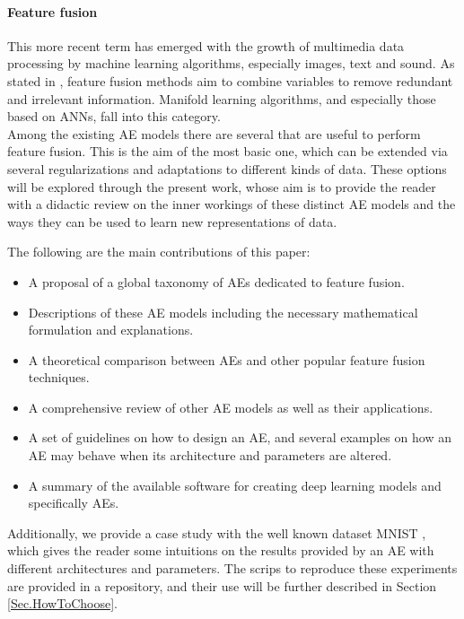 \documentclass[preprint,5p,compress]{elsarticle}
\begin{document}
    \paragraph{Feature fusion \cite{FeatureFusion}}
    This more recent term has emerged with the growth of multimedia data processing by machine learning algorithms, especially images, text and sound. As stated in \cite{FeatureFusion}, feature fusion methods aim to combine variables to remove redundant and irrelevant information. Manifold learning algorithms, and especially those based on ANNs, fall into this category. \\

    Among the existing AE models there are several that are useful to perform feature fusion. This is the aim of the most basic one, which can be extended via several regularizations and adaptations to different kinds of data. These options will be explored through the present work, whose aim is to provide the reader with a didactic review on the inner workings of these distinct AE models and the ways they can be used to learn new representations of data.

    The following are the main contributions of this paper:
    \begin{itemize}
	    \item A proposal of a global taxonomy of AEs dedicated to feature fusion.
	
	    \item Descriptions of these AE models including the necessary mathematical formulation and explanations.
	
	    \item A theoretical comparison between AEs and other popular feature fusion techniques.
	    
	    \item A comprehensive review of other AE models as well as their applications.
	      
	    \item A set of guidelines on how to design an AE, and several examples on how an AE may behave when its architecture and parameters are altered.

            \item A summary of the available software for creating deep learning models and specifically AEs.
    \end{itemize}

    Additionally, we provide a case study with the well known dataset MNIST \cite{MNIST}, which gives the reader some intuitions on the results provided by an AE with different architectures and parameters. The scrips to reproduce these experiments are provided in a repository, and their use will be further described in Section \ref{Sec.HowToChoose}.
\end{document}
